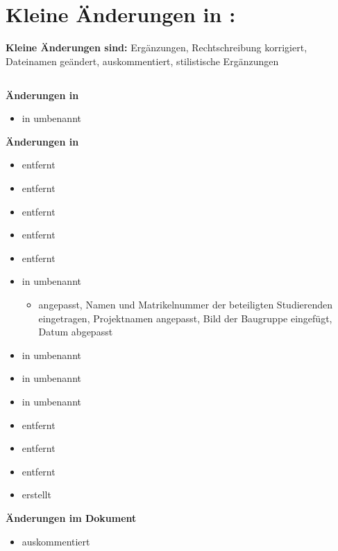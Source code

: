 %
%
%


\chapter{Kleine Änderungen in :}\label{klein}
\textbf{Kleine Änderungen sind:} Ergänzungen, Rechtschreibung korrigiert, Dateinamen geändert, auskommentiert, stilistische Ergänzungen
\section{}
\textbf{Änderungen in }
\begin{itemize}
	\item {} in  umbenannt
\end{itemize}
\textbf{Änderungen in }
\begin{itemize}
	\item {} entfernt
	\item {} entfernt
	\item {} entfernt
	\item {} entfernt
	\item {} entfernt
	\item {} in  umbenannt
    	\begin{itemize}
		\item {} angepasst, Namen und Matrikelnummer der beteiligten Studierenden eingetragen, Projektnamen angepasst, Bild der Baugruppe eingefügt, Datum abgepasst
    	\end{itemize}
	\item {} in  umbenannt
	\item {} in  umbenannt
	\item {} in  umbenannt
	\item {} entfernt
	\item {} entfernt
	\item {} entfernt
	\item {} erstellt
\end{itemize}
\textbf{Änderungen im Dokument }
    \begin{itemize}
	\item {} auskommentiert
    \end{itemize}



